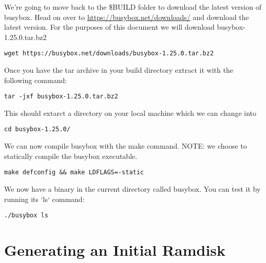 \documentclass[twocolumn]{article}
\begin{document}
We're going to move back to the \$BUILD folder to download the latest version of busybox. Head on over to \url{https://busybox.net/downloads/} and download the latest version. For the purposes of this document we will download busybox-1.25.0.tar.bz2
\begin{lstlisting}
wget https://busybox.net/downloads/busybox-1.25.0.tar.bz2
\end{lstlisting}
Once you have the tar archive in your build directory extract it with the following command:
\begin{lstlisting}
tar -jxf busybox-1.25.0.tar.bz2
\end{lstlisting}
This should extarct a directory on your local machine which we can change into
\begin{lstlisting}
cd busybox-1.25.0/
\end{lstlisting}
We can now compile busybox with the make command. NOTE: we choose to statically compile the busybox executable.
\begin{lstlisting}
make defconfig && make LDFLAGS=-static
\end{lstlisting}
We now have a binary in the current directory called busybox. You can test it by running its `ls` command:
\begin{lstlisting}
./busybox ls
\end{lstlisting}

\section{Generating an Initial Ramdisk}
\end{document}
